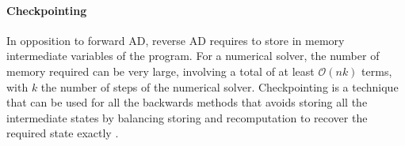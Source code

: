 
\paragraph{Checkpointing}
\label{section:checkpointing}

In opposition to forward AD, reverse AD requires to store in memory intermediate variables of the program. 
For a numerical solver, the number of memory required can be very large, involving a total of at least $\mathcal O(nk)$ terms, with $k$ the number of steps of the numerical solver. 
Checkpointing is a technique that can be used for all the backwards methods that avoids storing all the intermediate states by balancing  storing and recomputation to recover the required state exactly \cite{Griewank:2008kh}.


